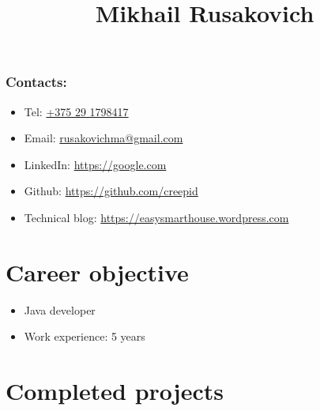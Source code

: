 \documentclass[a4paper, 12pt]{article}
\title{Mikhail Rusakovich}
\author{}
\date{}
\begin{document}
\maketitle

\subsubsection*{Contacts:}
\begin{itemize}
    \item Tel: \href{tel:+375291798417}{+375 29 1798417}
    \item Email: \href{mailto:rusakovichma@gmail.com}{rusakovichma@gmail.com}
    \item LinkedIn: \href{https://google.com}{https://google.com}
    \item Github: \href{https://github.com/creepid}{https://github.com/creepid}
    \item Technical blog: \href{https://easysmarthouse.wordpress.com}{https://easysmarthouse.wordpress.com}
\end{itemize}

\section*{Career objective}

    \begin{itemize}
        \item Java developer
        \item Work experience: 5 years
    \end{itemize}


\section*{Completed projects}
\end{document}
